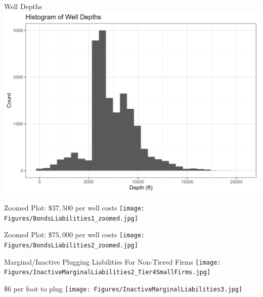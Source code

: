 \documentclass{beamer}
\begin{document}
\begin{frame}{Well Depths}
\label{depths}
\centering
    \includegraphics[scale=0.12]{Figures/DepthHistogram.jpg}\\
    \hyperlink{costcalc}{}
\end{frame}

\begin{frame}{Zoomed Plot: $\$37,500$ per well costs}
\label{Liability1Zoom}
\texttt{[image: Figures/BondsLiabilities1\_zoomed.jpg]}\\
\hyperlink{Fig1}{}
\end{frame}


\begin{frame}{Zoomed Plot: $\$75,000$ per well costs}
\label{Liability2Zoom}
\texttt{[image: Figures/BondsLiabilities2\_zoomed.jpg]}\\
\hyperlink{Fig2}{}
\end{frame}

\begin{frame}{Marginal/Inactive Plugging Liabilities For Non-Tiered Firms}
\label{Tier4Liability2}
\vspace{-0.3cm}
    \texttt{[image: Figures/InactiveMarginalLiabilities2\_Tier4SmallFirms.jpg]}

    \hyperlink{Fig2Marginal}{}
\end{frame}

\begin{frame}{$\$6$ per foot to plug}
\label{MarginalInactiveLiability3}
    \texttt{[image: Figures/InactiveMarginalLiabilities3.jpg]}
\end{frame}
\end{document}
